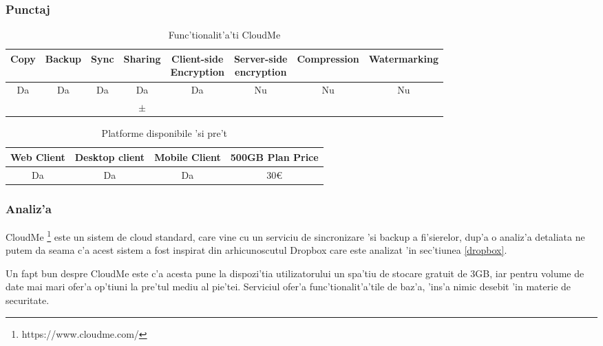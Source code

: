 \documentclass[12pt,a4paper,twoside]{report}
\newcommand{\greencheck}{\color{green}  \ding{51}}
\newcommand{\orangepm}{\color{orange} \textbf{$\pm$}}
\newcommand{\redxmark}{\color{red} \ding{55}}
\begin{document}
\subsubsection{Punctaj}
\begin{table}[H]
\centering
\caption{Func'tionalit'a'ti CloudMe}
\begin{tabular}{|c|c|c|c|c|c|c|c|}          
\hline               
Copy & Backup & Sync & Sharing & \makecell{Client-side\\ Encryption} & \makecell{Server-side \\ encryption} & Compression & Watermarking \\ [0.5ex]   
\hline 
Da & Da & Da & Da & Da &  Nu & Nu & Nu    \\                      
\greencheck & \greencheck & \redxmark\redxmark & \orangepm & \greencheck\greencheck & \redxmark\redxmark &  \redxmark\redxmark &  \redxmark\redxmark  \\               
\hline                              
\end{tabular}
\label{table:cloudmefeaturetable}             
\end{table}
\begin{table}[H]
\centering
\caption{Platforme disponibile 'si pre't}
\begin{tabular}{|c|c|c|c|}          
\hline                      
 Web Client & Desktop client & Mobile Client & 500GB Plan Price\\ [0.5ex]   
\hline                            
Da & Da & Da & 30\euro\\               
\hline                              
\end{tabular}
\label{table:cloudmesystemtable}             
\end{table}
\subsubsection{Analiz'a}
CloudMe \footnote{https://www.cloudme.com/} este un sistem de cloud standard, care vine cu un serviciu de sincronizare 'si backup a fi'sierelor, dup'a o analiz'a detaliata ne putem da seama c'a acest sistem a fost inspirat din arhicunoscutul Dropbox care este analizat 'in sec'tiunea \ref{dropbox}.

Un fapt bun despre CloudMe este c'a acesta pune la dispozi'tia utilizatorului un spa'tiu de stocare gratuit de 3GB, iar pentru volume de date mai mari ofer'a op'tiuni la pre'tul mediu al pie'tei. Serviciul ofer'a func'tionalit'a'tile de baz'a, 'ins'a nimic desebit 'in materie de securitate. 
\end{document}

